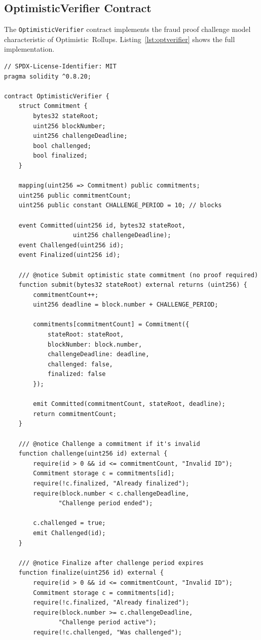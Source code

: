 \documentclass[
]{elteikthesis}[2024/04/26]
\begin{document}
\subsection{OptimisticVerifier Contract}

The \texttt{OptimisticVerifier} contract implements the fraud proof challenge model characteristic of Optimistic~Rollups. Listing~\ref{lst:optverifier} shows the full implementation.

\begin{listing}[H]
    \begin{verbatim}
// SPDX-License-Identifier: MIT
pragma solidity ^0.8.20;

contract OptimisticVerifier {
    struct Commitment {
        bytes32 stateRoot;
        uint256 blockNumber;
        uint256 challengeDeadline;
        bool challenged;
        bool finalized;
    }

    mapping(uint256 => Commitment) public commitments;
    uint256 public commitmentCount;
    uint256 public constant CHALLENGE_PERIOD = 10; // blocks
    
    event Committed(uint256 id, bytes32 stateRoot, 
                   uint256 challengeDeadline);
    event Challenged(uint256 id);
    event Finalized(uint256 id);

    /// @notice Submit optimistic state commitment (no proof required)
    function submit(bytes32 stateRoot) external returns (uint256) {
        commitmentCount++;
        uint256 deadline = block.number + CHALLENGE_PERIOD;
        
        commitments[commitmentCount] = Commitment({
            stateRoot: stateRoot,
            blockNumber: block.number,
            challengeDeadline: deadline,
            challenged: false,
            finalized: false
        });
        
        emit Committed(commitmentCount, stateRoot, deadline);
        return commitmentCount;
    }

    /// @notice Challenge a commitment if it's invalid
    function challenge(uint256 id) external {
        require(id > 0 && id <= commitmentCount, "Invalid ID");
        Commitment storage c = commitments[id];
        require(!c.finalized, "Already finalized");
        require(block.number < c.challengeDeadline, 
               "Challenge period ended");
        
        c.challenged = true;
        emit Challenged(id);
    }

    /// @notice Finalize after challenge period expires
    function finalize(uint256 id) external {
        require(id > 0 && id <= commitmentCount, "Invalid ID");
        Commitment storage c = commitments[id];
        require(!c.finalized, "Already finalized");
        require(block.number >= c.challengeDeadline, 
               "Challenge period active");
        require(!c.challenged, "Was challenged");
        

\end{verbatim}
\end{listing}
\end{document}
